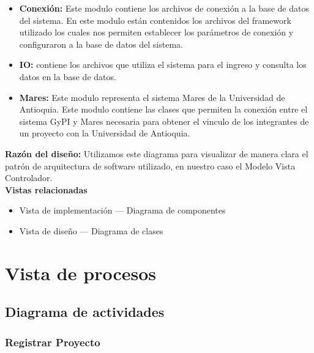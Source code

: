\documentclass[12pt,oneside,letterpaper]{report}
\begin{document}
\begin{itemize}
 \item \textbf{Conexión:} Este modulo contiene los archivos de conexión a la base de datos del sistema. En este modulo están contenidos los archivos del framework utilizado los cuales nos permiten establecer los parámetros de conexión y configuraron a la base de datos del sistema.
 \item \textbf{IO:} contiene los archivos que utiliza el sistema para el ingreso y consulta los datos en la base de datos.
 \item \textbf{Mares:} Este modulo representa el sistema Mares de la Universidad de Antioquia. Este modulo contiene las clases que permiten la conexión entre el sistema GyPI y Mares necesaria para obtener el vinculo de los integrantes de un proyecto con la Universidad de Antioquia.
\end{itemize}

\textbf{Razón del diseño:}
Utilizamos este diagrama para visualizar de manera clara el patrón de arquitectura de software utilizado, en nuestro caso el Modelo Vista Controlador.\\

\textbf{Vistas relacionadas}
\begin{itemize}
 \item Vista de implementación --- Diagrama de componentes
 \item Vista de diseño --- Diagrama de clases
\end{itemize}


\section{Vista de procesos}

\subsection{Diagrama de actividades}


\subsubsection{Registrar Proyecto}
\end{document}
